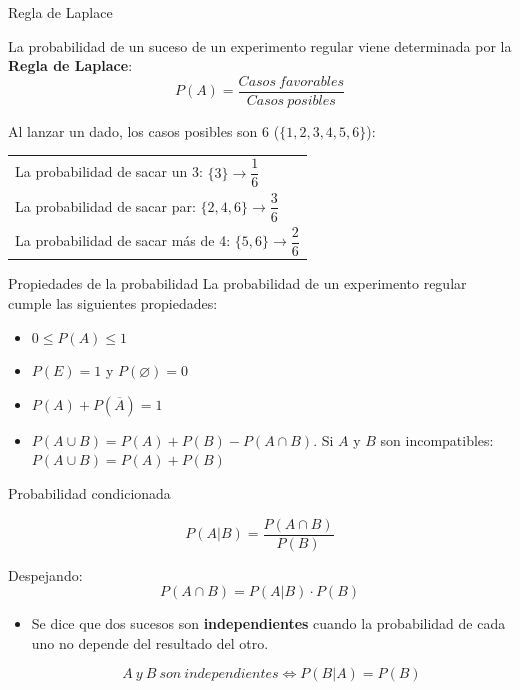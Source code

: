 \documentclass[11pt,handout]{beamer}
\begin{document}
\begin{frame}{Regla de Laplace}
\begin{block}{}
 La probabilidad de un suceso de un experimento regular viene determinada por la \textbf{Regla de Laplace}:
$$P(A)=\dfrac{Casos\ favorables}{Casos\ posibles} $$
\end{block}

Al lanzar un dado, los casos posibles son 6 ($\lbrace1,2,3,4,5,6\rbrace$):\\
\begin{tabular}{l}
La probabilidad de sacar un 3: $\lbrace3\rbrace\to \dfrac{1}{6}$\\
La probabilidad de sacar par: $\lbrace2,4,6\rbrace\to\dfrac{3}{6}$ \\
La probabilidad de sacar más de 4: $\lbrace5,6\rbrace\to\dfrac{2}{6}$
\end{tabular}

\end{frame}

\begin{frame}{Propiedades de la probabilidad} La probabilidad de un experimento regular cumple las siguientes propiedades:
\begin{itemize}[<+->]
\item $0 \leq P(A) \leq 1$ 
\item $P(E) = 1$ y $P(\varnothing) = 0$
\item $P(A) + P(\overline A) = 1$
\item $P(A \cup B) = P(A) + P(B) - P(A \cap B)$. Si $A$ y $B$ son incompatibles: $P(A \cup B) = P(A) + P(B)$
\end{itemize}
\end{frame}


\begin{frame}{Probabilidad condicionada}
\begin{block}{}
$$P(A|B)=\dfrac{P(A\cap B)}{P(B)}$$
\end{block}
Despejando:
$$P(A\cap B) = P(A|B)\cdot P(B)$$

\begin{itemize}[<+->]
\item Se dice que dos sucesos son \textbf{independientes} cuando la probabilidad de cada uno no depende del resultado del otro. 

$$A\ y \ B\ son \ independientes \Longleftrightarrow P(B|A)=P(B)$$

\end{itemize}
\end{frame}
\end{document}
